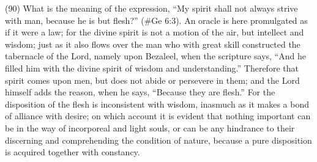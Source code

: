 (90) What is the meaning of the expression, ``My spirit shall not always strive with man, because he
is but flesh?'' (\#Ge 6:3). An oracle is here promulgated as if it were a law; for the divine spirit is
not a motion of the air, but intellect and wisdom; just as it also flows over the man who with great
skill constructed the tabernacle of the Lord, namely upon Bezaleel, when the scripture says, ``And
he filled him with the divine spirit of wisdom and understanding.'' Therefore that spirit comes upon
men, but does not abide or persevere in them; and the Lord himself adds the reason, when he
says, ``Because they are flesh.'' For the disposition of the flesh is inconsistent with wisdom,
inasmuch as it makes a bond of alliance with desire; on which account it is evident that nothing
important can be in the way of incorporeal and light souls, or can be any hindrance to their
discerning and comprehending the condition of nature, because a pure disposition is acquired
together with constancy.

